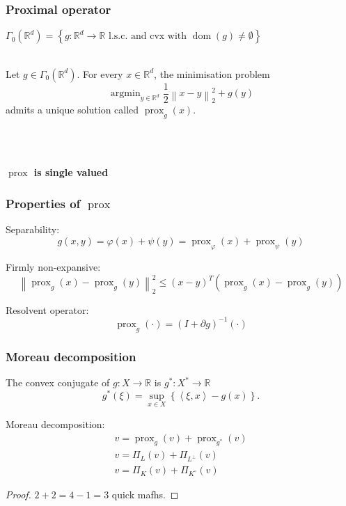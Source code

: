 \documentclass[aspectratio=169]{beamer}
\DeclareMathOperator{\Prox}{prox}
\newcommand{\prox}[2]{\Prox_{#1}\left({#2}\right)}
\newcommand{\RR}{\mathbb{R}}
\newcommand{\rd}{\mathbb{R}^d}
\newcommand{\normtwosq}[1]{\left\|#1\right\|_2^2}
\renewcommand{\phi}{\varphi}
\DeclareMathOperator*{\argmin}{argmin}
\DeclareMathOperator{\dom}{dom}
\begin{document}
		\begin{frame}
		\frametitle{Proximal operator}
		$\Gamma_0(\rd) = \left\{g:\rd\to\RR\text{ l.s.c. and cvx with } \dom(g)\ne\emptyset\right\}$
		\quad \\ \quad \\
		\begin{definition}
		Let $g\in\Gamma_0(\rd)$. For every $x \in \rd$, the minimisation problem
		\begin{equation}
		\nonumber
		\argmin_{y\in\rd} \frac{1}{2}\normtwosq{x-y} + g(y)
		\end{equation}
		admits a unique solution called $\prox{g}{x}$.
		\end{definition}
		\pause
		\quad \\ \quad \\ 
		\begin{center}
		\textbf{$\Prox$ is single valued}
		\end{center}
		\end{frame}

		\begin{frame}
		\frametitle{Properties of $\Prox$}
		Separability:
		\begin{equation}
		\nonumber g(x,y) = \phi(x)+\psi(y) = \prox{\phi}{x} + \prox{\psi}{y}
		\end{equation}
		
		{Firmly non-expansive}:
		\begin{equation}
		\nonumber \normtwosq{\prox{g}{x}-\prox{g}{y}} \le \left(x-y\right)^T\left(\prox{g}{x} - \prox{g}{y}\right)
		\end{equation}
		
		Resolvent operator: 
		\begin{equation}
		\nonumber \prox{g}{\cdot} = \left(I + \partial g\right)^{-1} (\cdot)
		\end{equation}
		\end{frame}
		
		\begin{frame}
		\frametitle{Moreau decomposition}
		\begin{definition}
		The convex conjugate of $g:X\to\RR$ is $g^*:X^*\to\RR$
		\begin{equation}
		\nonumber
		g^*(\xi) = \sup_{x\in X}\left\{\left<\xi,x\right>-g(x)\right\}.
		\end{equation}
		\end{definition}		
		\pause
		{Moreau decomposition}:
		\begin{gather}
		\nonumber v = \prox{g}{v} + \prox{g^*}{v}\\
		\nonumber v = \Pi_L(v) + \Pi_{L^\perp}(v)\\
		\nonumber v = \Pi_K(v) + \Pi_{K^\circ}(v)
		\end{gather}
		\begin{proof}
		$2+2=4-1=3$ quick mafhs.
		\end{proof}
		\end{frame}
		
\end{document}
